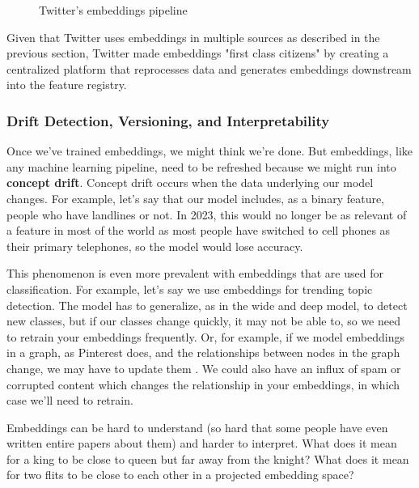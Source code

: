 \documentclass[11pt, table]{diazessay} %
\begin{document}
\begin{sloppypar}
\begin{figure}[H]
\caption{Twitter's embeddings pipeline \citep{shiebler2010making}}
\end{figure}

Given that Twitter uses embeddings in multiple sources as described in the previous section, Twitter made embeddings "first class citizens" by creating a centralized platform that reprocesses data and generates embeddings downstream into the feature registry.

\subsubsection{Drift Detection, Versioning, and Interpretability}

Once we've trained embeddings, we might think we're done. But embeddings, like any machine learning pipeline, need to be refreshed because we might run into \textbf{concept drift}. Concept drift occurs when the data underlying our model changes. For example, let's say that our model includes, as a binary feature, people who have landlines or not. In 2023, this would no longer be as relevant of a feature in most of the world as most people have switched to cell phones as their primary telephones, so the model would lose accuracy.

This phenomenon is even more prevalent with embeddings that are used for classification. For example, let's say we use embeddings for trending topic detection. The model has to generalize, as in the wide and deep model, to detect new classes, but if our classes change quickly, it may not be able to, so we need to retrain your embeddings frequently. Or, for example, if we model embeddings in a graph, as Pinterest does, and the relationships between nodes in the graph change, we may have to update them \citep{wewer2021updating}. We could also have an influx of spam or corrupted content which changes the relationship in your embeddings, in which case we'll need to retrain.

Embeddings can be hard to understand (so hard that some people have even written entire papers about them) and harder to interpret. What does it mean for a king to be close to queen but far away from the knight? What does it mean for two flits to be close to each other in a projected embedding space?  


\end{sloppypar}
\end{document}

